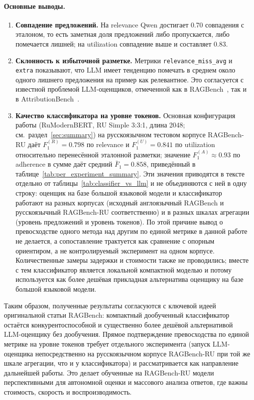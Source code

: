\paragraph{Основные выводы.}
\begin{enumerate}
  \item \textbf{Совпадение предложений.} На relevance Qwen достигает 0.70 совпадения с
  эталоном, то есть заметная доля предложений либо пропускается, либо помечается
  лишней; на utilization совпадение выше и составляет 0.83.
  \item \textbf{Склонность к избыточной разметке.} Метрики
  \texttt{relevance\_miss\_avg} и \texttt{extra} показывают, что LLM имеет тенденцию
  помечать в среднем около одного лишнего предложения на пример как релевантное. Это
  согласуется с известной проблемой LLM-оценщиков, отмеченной как в
  RAGBench~\cite{friel2024ragbench}, так и в AttributionBench~\cite{li2024attributionbench}.
\item \textbf{Качество классификатора на уровне токенов.}
  Основная конфигурация работы (RuModernBERT, RU Simple 3:3:1, длина 2048;
  см.~раздел~\ref{sec:summary}) на русскоязычном тестовом корпусе RAGBench-RU
  даёт $F_1^{(R)} = 0.798$ по relevance и $F_1^{(U)} = 0.841$ по utilization
  относительно перенесённой эталонной разметки; значение $F_1^{(A)} \approx 0.93$
  по adherence в сумме даёт средний $\bar F_1 = 0.858$, приведённый в
  таблице~\ref{tab:per_experiment_summary}. Эти значения приводятся в
  тексте отдельно от таблицы~\ref{tab:classifier_vs_llm} и не объединяются с
  ней в одну строку: оценщик на базе большой языковой модели и классификатор
  работают на разных корпусах (исходный англоязычный RAGBench и русскоязычный
  RAGBench-RU соответственно) и в разных шкалах агрегации (уровень предложений
  и уровень токенов). По этой причине вывод о превосходстве одного метода над
  другим по единой метрике в данной работе не делается, а сопоставление
  трактуется как сравнение с опорным ориентиром, а не контролируемый
  эксперимент на одном корпусе. Количественные замеры задержки и стоимости
  также не проводились; вместе с тем классификатор является локальной
  компактной моделью и потому используется как более дешёвая прикладная
  альтернатива оценщику на базе большой языковой модели.

\end{enumerate}

Таким образом, полученные результаты согласуются с ключевой идеей оригинальной
статьи RAGBench: компактный дообученный классификатор остаётся конкурентоспособной
и существенно более дешёвой альтернативой LLM-оценщику без дообучения. Прямое
подтверждение превосходства по единой метрике на уровне токенов требует
отдельного эксперимента (запуск LLM-оценщика непосредственно на русскоязычном
корпусе RAGBench-RU при той же шкале агрегации, что и у классификатора) и
рассматривается как направление дальнейшей работы. Это делает обученные на RAGBench-RU
модели перспективными для автономной оценки и массового анализа ответов, где важны стоимость,
скорость и воспроизводимость.

